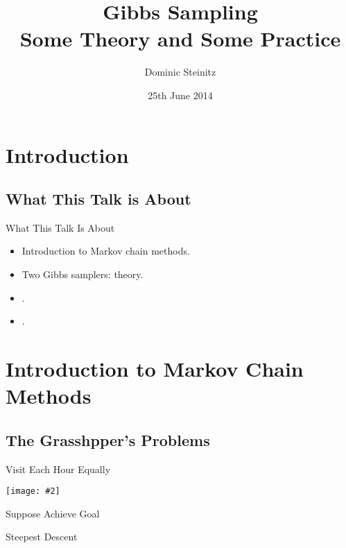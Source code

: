 \documentclass{beamer}
\title[Gibbs Sampling]{Gibbs Sampling \\ Some Theory and Some Practice}
\author{Dominic Steinitz}
\date{25th June 2014}
\newcommand {\framedgraphic}[2] {
    \begin{frame}{#1}
        \begin{center}
            \texttt{[image: \#2]}
        \end{center}
    \end{frame}
}
\begin{document}
\begin{frame}
\titlepage
\end{frame}

\section{Introduction}

\subsection{What This Talk is About}

\begin{frame}{What This Talk Is About}

  \begin{itemize}
  \item Introduction to Markov chain methods.
  \item Two Gibbs samplers: theory.
  \item .
  \item .
  \end{itemize}

\end{frame}

\section{Introduction to Markov Chain Methods}

\subsection{The Grasshpper's Problems}

\framedgraphic{Visit Each Hour Equally}{diagrams/ClockEqual12.png}

\begin{frame}[fragile]{Suppose Achieve Goal}


\end{frame}

\begin{frame}[fragile]{Steepest Descent}
\end{frame}
\end{document}
